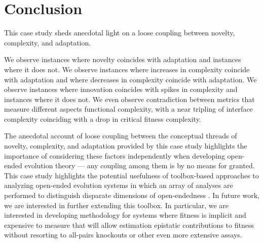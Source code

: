 \section{Conclusion}

This case study sheds anecdotal light on a loose coupling between novelty, complexity, and adaptation.

We observe instances where novelty coincides with adaptation and instances where it does not. We observe instances where increases in complexity coincide with adaptation and where decreases in complexity coincide with adaptation. We observe instances where innovation coincides with spikes in complexity and instances where it does not. We even observe contradiction between metrics that measure different aspects functional complexity, with a near tripling of interface complexity coinciding with a drop in critical fitness complexity.

The anecdotal account of loose coupling between the conceptual threads of novelty, complexity, and adaptation provided by this case study highlights the importance of considering these factors independently when developing open-ended evolution theory --- any coupling among them is by no means for granted.
This case study highlights the potential usefulness of toolbox-based approaches to analyzing open-ended evolution systems in which an array of analyses are performed to distinguish disparate dimensions of open-endedness \citep{dolson2019modes}.
In future work, we are interested in further extending this toolbox.
In particular, we are interested in developing methodology for systems where fitness is implicit and expensive to measure that will allow estimation epistatic contributions to fitness without resorting to all-pairs knockouts or other even more extensive assays.








